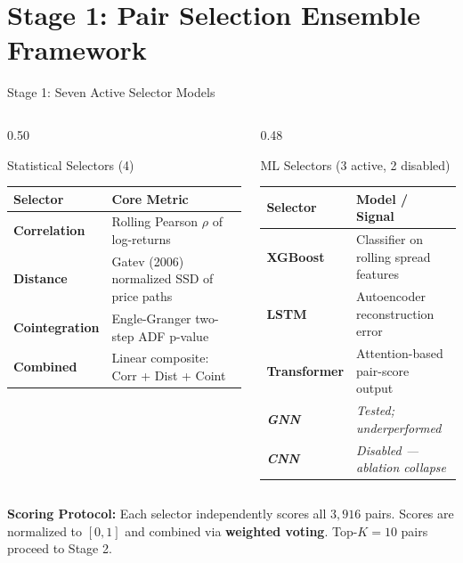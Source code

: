 \documentclass[aspectratio=169,10pt]{beamer}
\begin{document}
\section{Stage 1: Pair Selection Ensemble Framework}

\begin{frame}{Stage 1: Seven Active Selector Models}
  \vspace{2pt}
  \begin{columns}[T]
    \begin{column}{0.50\textwidth}
      \begin{block}{\color{white}Statistical Selectors (4)}
        \scriptsize\renewcommand{\arraystretch}{1.3}
        \begin{tabular}{>{\bfseries}lp{4.8cm}}
          \toprule
          Selector & Core Metric \\
          \midrule
          Correlation  & Rolling Pearson $\rho$ of log-returns \\
          Distance     & Gatev (2006) normalized SSD of price paths \\
          Cointegration & Engle-Granger two-step ADF p-value \\
          Combined     & Linear composite: Corr + Dist + Coint \\
          \bottomrule
        \end{tabular}
      \end{block}
    \end{column}
    \begin{column}{0.48\textwidth}
      \begin{block}{\color{white}ML Selectors (3 active, 2 disabled)}
        \scriptsize\renewcommand{\arraystretch}{1.3}
        \begin{tabular}{>{\bfseries}lp{4.4cm}}
          \toprule
          Selector & Model / Signal \\
          \midrule
          XGBoost   & Classifier on rolling spread features \\
          LSTM      & Autoencoder reconstruction error \\
          Transformer & Attention-based pair-score output \\
          \midrule
          \textit{GNN}  & \textit{Tested; underperformed} \\
          \textit{CNN}  & \textit{Disabled --- ablation collapse} \\
          \bottomrule
        \end{tabular}
      \end{block}
    \end{column}
  \end{columns}
  \vspace{5pt}
  \small\textbf{Scoring Protocol:} Each selector independently scores all $3{,}916$ pairs. Scores are normalized to $[0,1]$ and combined via \textbf{weighted voting}. Top-$K{=}10$ pairs proceed to Stage 2.
\end{frame}
\end{document}
